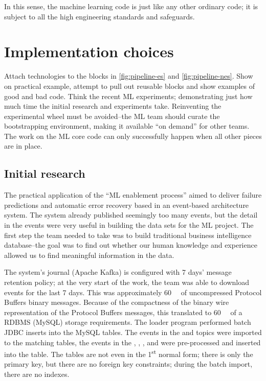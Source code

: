 \documentclass[10 pt, twocolumn]{article}
\begin{document}
In this sense, the machine learning code is just like any other ordinary code; it is subject to all the high engineering standards and safeguards.

\section{Implementation choices}
Attach technologies to the blocks in \autoref{fig:pipeline-es} and \autoref{fig:pipeline-nes}. Show on practical example, attempt to pull out reusable blocks and show examples of good and bad code. Think the recent ML experiments; demonstrating just how much time the initial research and experiments take. Reinventing the experimental wheel must be avoided--the ML team should curate the bootstrapping environment, making it available ``on demand'' for other teams. The work on the ML core code can only successfully happen when all other pieces are in place. 

\subsection{Initial research}
The practical application of the ``ML enablement process'' aimed to deliver failure predictions and automatic error recovery based in an event-based architecture system. The system already published seemingly too many events, but the detail in the events were very useful in building the data sets for the ML project. The first step the team needed to take was to build traditional business intelligence database--the goal was to find out whether our human knowledge and experience allowed us to find meaningful information in the data.

The system's journal (Apache Kafka\cite{kafka}) is configured with 7 days' message retention policy; at the very start of the work, the team was able to download events for the last 7 days. This was approximately \SI{60}{\gibi\byte} of uncompressed Protocol Buffers\cite{protobuf} binary messages. Because of the compactness of the binary wire representation of the Protocol Buffers messages, this translated to \SI{60}{\gibi\byte} of a RDBMS (MySQL\cite{mysql}) storage requirements. The loader program performed batch JDBC inserts into the MySQL tables. The events in the  and  topics were imported to the matching tables, the events in the , , , and  were pre-processed and inserted into the  table. The tables are not even in the 1\textsuperscript{st} normal form; there is only the primary key, but there are no foreign key constraints; during the batch import, there are no indexes. 
\end{document}
